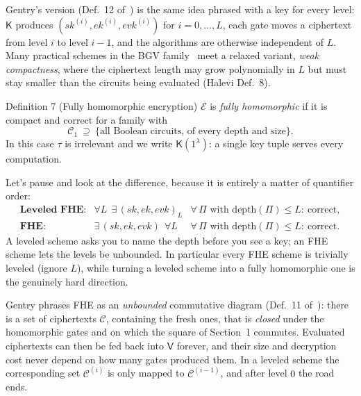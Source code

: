 \documentclass[11pt,a4paper]{article}
\newcommand{\Eval}{\mathsf{V}}
\newcommand{\KeyGen}{\mathsf{K}}
\newcommand{\sk}{\mathit{sk}}
\newcommand{\ek}{\mathit{ek}}
\newcommand{\evk}{\mathit{evk}}
\newcommand{\Ctx}{\mathcal{C}}
\begin{document}
\noindent
Gentry's version (Def.~12 of~\cite{gentry}) is the same idea phrased with a
key for every level: $\KeyGen$ produces $(\sk^{(i)},\ek^{(i)},\evk^{(i)})$ for
$i=0,\dots,L$, each gate moves a ciphertext from level $i$ to level $i-1$, and
the algorithms are otherwise independent of $L$. Many practical schemes in the
BGV family~\cite{bgv} meet a relaxed variant, \emph{weak compactness}, where
the ciphertext length may grow polynomially in $L$ but must stay smaller
than the circuits being evaluated (Halevi Def.~8).

\begin{formal}{Definition 7 (Fully homomorphic encryption)}
$\mathcal{E}$ is \emph{fully homomorphic} if it is compact and correct for a
family with
\[
\mathcal{C}_1\ \supseteq\ \{\text{all Boolean circuits, of every depth and size}\}.
\]
In this case $\tau$ is irrelevant and we write $\KeyGen(1^\lambda)$: a single
key tuple serves every computation.
\end{formal}

\noindent
Let's pause and look at the difference, because it is entirely a matter of
quantifier order:
\[
\begin{array}{lll}
\textbf{Leveled FHE:} & \forall L\ \ \exists\,(\sk,\ek,\evk)_L & \forall\,\Pi \text{ with } \mathrm{depth}(\Pi)\le L:\ \text{correct},\\[2pt]
\textbf{FHE:}         & \exists\,(\sk,\ek,\evk)\ \ \forall L & \forall\,\Pi \text{ with } \mathrm{depth}(\Pi)\le L:\ \text{correct}.
\end{array}
\]
A leveled scheme asks you to name the depth before you see a key; an FHE
scheme lets the levels be unbounded. In particular every FHE scheme is
trivially leveled (ignore $L$), while turning a leveled scheme into a fully
homomorphic one is the genuinely hard direction.

\begin{aside}
Gentry phrases FHE as an \emph{unbounded} commutative diagram (Def.~11
of~\cite{gentry}): there is a set of ciphertexts $\Ctx$, containing the fresh
ones, that is \emph{closed} under the homomorphic gates and on which the
square of Section~1 commutes. Evaluated ciphertexts can then be fed back into
$\Eval$ forever, and their size and decryption cost never depend on how many
gates produced them. In a leveled scheme the corresponding set $\Ctx^{(i)}$ is
only mapped to $\Ctx^{(i-1)}$, and after level $0$ the road ends.
\end{aside}
\end{document}
